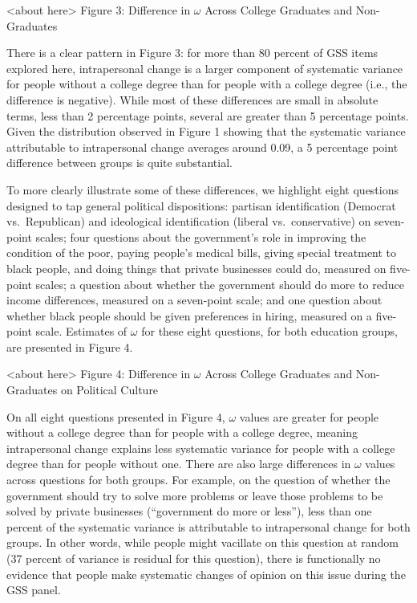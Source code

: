 \documentclass[
  12pt,
]{article}
\begin{document}
\begin{center}
<about here>
Figure 3: Difference in $\omega$ Across College Graduates and Non-Graduates
\end{center}

There is a clear pattern in Figure 3: for more than 80 percent of GSS
items explored here, intrapersonal change is a larger component of
systematic variance for people without a college degree than for people
with a college degree (i.e., the difference is negative). While most of
these differences are small in absolute terms, less than 2 percentage
points, several are greater than 5 percentage points. Given the
distribution observed in Figure 1 showing that the systematic variance
attributable to intrapersonal change averages around 0.09, a 5
percentage point difference between groups is quite substantial.

To more clearly illustrate some of these differences, we highlight eight
questions designed to tap general political dispositions: partisan
identification (Democrat vs.~Republican) and ideological identification
(liberal vs.~conservative) on seven-point scales; four questions about
the government's role in improving the condition of the poor, paying
people's medical bills, giving special treatment to black people, and
doing things that private businesses could do, measured on five-point
scales; a question about whether the government should do more to reduce
income differences, measured on a seven-point scale; and one question
about whether black people should be given preferences in hiring,
measured on a five-point scale. Estimates of \(\omega\) for these eight
questions, for both education groups, are presented in Figure 4.

\begin{center}
<about here>
Figure 4: Difference in $\omega$ Across College Graduates and Non-Graduates on Political Culture
\end{center}

On all eight questions presented in Figure 4, \(\omega\) values are
greater for people without a college degree than for people with a
college degree, meaning intrapersonal change explains less systematic
variance for people with a college degree than for people without one.
There are also large differences in \(\omega\) values across questions
for both groups. For example, on the question of whether the government
should try to solve more problems or leave those problems to be solved
by private businesses (``government do more or less''), less than one
percent of the systematic variance is attributable to intrapersonal
change for both groups. In other words, while people might vacillate on
this question at random (37 percent of variance is residual for this
question), there is functionally no evidence that people make systematic
changes of opinion on this issue during the GSS panel.
\end{document}
